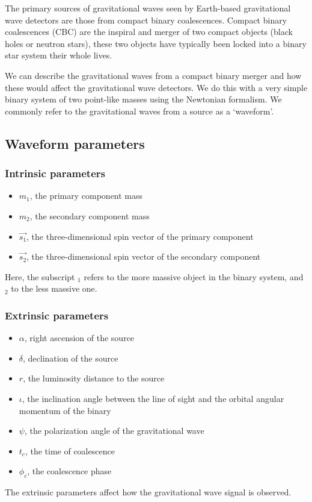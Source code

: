 The primary sources of gravitational waves seen by Earth-based gravitational wave detectors are those from compact binary coalescences. Compact binary coalescences (CBC) are the inspiral and merger of two compact objects (black holes or neutron stars), these two objects have typically been locked into a binary star system their whole lives.

We can describe the gravitational waves from a compact binary merger and how these would affect the gravitational wave detectors. We do this with a very simple binary system of two point-like masses using the Newtonian formalism. We commonly refer to the gravitational waves from a source as a `waveform'.

\subsection{\label{1:sec:CBC-parameters}Waveform parameters}

\subsubsection{Intrinsic parameters}
\begin{itemize}
   \item $m_{1}$, the primary component mass
   \item $m_{2}$, the secondary component mass
   \item $\vec{s_{1}}$, the three-dimensional spin vector of the primary component
   \item $\vec{s_{2}}$, the three-dimensional spin vector of the secondary component
\end{itemize}
Here, the subscript $_1$ refers to the more massive object in the binary system, and $_2$ to the less massive one.

\subsubsection{Extrinsic parameters}
\begin{itemize}
   \item $\alpha$, right ascension of the source
   \item $\delta$, declination of the source
   \item $r$, the luminosity distance to the source
   \item $\iota$, the inclination angle between the line of sight and the orbital angular momentum of the binary
   \item $\psi$, the polarization angle of the gravitational wave
   \item $t_{c}$, the time of coalescence
   \item $\phi_{c}$, the coalescence phase
\end{itemize}
The extrinsic parameters affect how the gravitational wave signal is observed.


